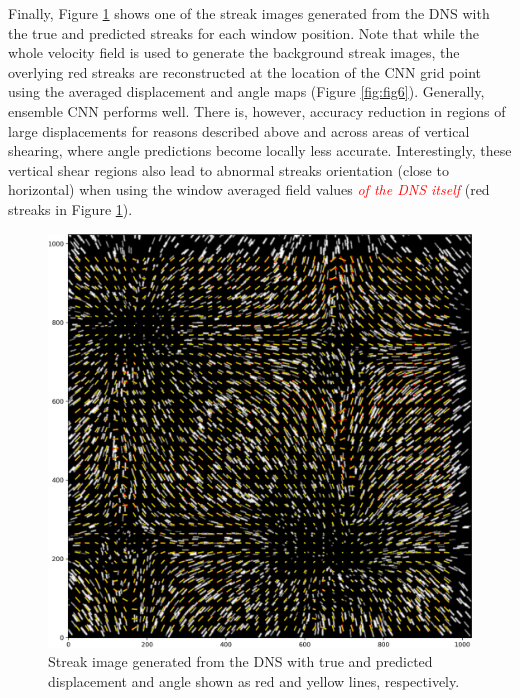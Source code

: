 \documentclass{svjour3}                     %
\newcommand{\new}[1]{\textit{\textcolor{red}{#1}}}
\begin{document}
Finally, Figure \ref{fig:fig8} shows one of the streak images generated from the DNS with the true and predicted streaks for each window position. Note that while the whole velocity field is used to generate the background streak images, the overlying red streaks are reconstructed at the location of the CNN grid point using the averaged displacement and angle maps (Figure \ref{fig:fig6}). Generally, ensemble CNN performs well. There is, however, accuracy reduction in regions of large displacements for reasons described above and across areas of vertical shearing, where angle predictions become locally less accurate. Interestingly, these vertical shear regions also lead to abnormal streaks orientation (close to horizontal) when using the window averaged field values \new{of the DNS itself} (red streaks in Figure \ref{fig:fig8}).

\begin{figure}
\includegraphics[width=\textwidth]{figs/figure7.png}
\caption{Streak image generated from the DNS with true and predicted displacement and angle shown as red and yellow lines, respectively.}
\label{fig:fig8}
\end{figure}
\end{document}
